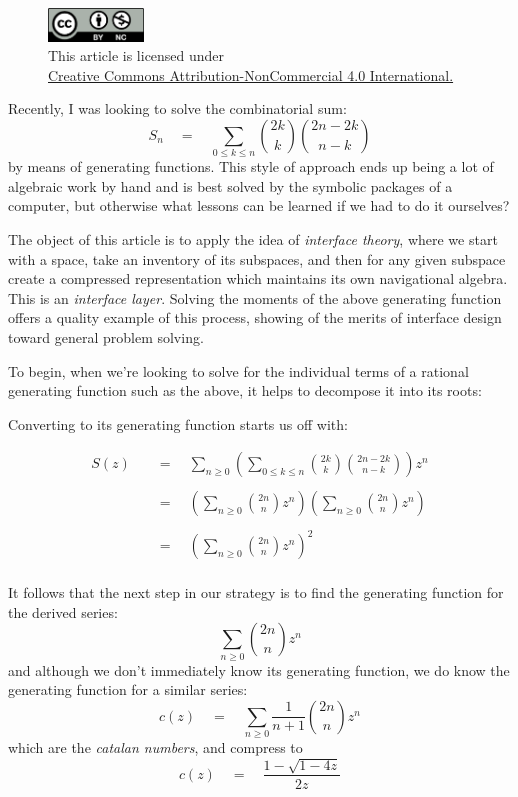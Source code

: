 \documentclass[twoside]{article}
\newcommand{\equals}{\ensuremath{\quad =\quad}}
\newcommand{\cat}{\ensuremath{c}}
\begin{document}
\begin{figure}[h]
\centering
\includegraphics[width=1in]{cc-by-nc.png}\\[0.1in]
\tiny This article is licensed under \\
\href{http://creativecommons.org/licenses/by-nc/4.0/}
{Creative Commons Attribution-NonCommercial 4.0 International.}\\[0.3in]
\end{figure}

Recently, I was looking to solve the combinatorial sum:
$$ S_n \equals \sum_{0\le k\le n}{2k \choose k}{2n-2k \choose n-k} $$
by means of generating functions. This style of approach ends up being a lot of algebraic work by hand and is best solved by
the symbolic packages of a computer, but otherwise what lessons can be learned if we had to do it ourselves?

The object of this article is to apply the idea of \emph{interface theory}, where we start with a space, take an inventory
of its subspaces, and then for any given subspace create a compressed representation which maintains its own navigational algebra.
This is an \emph{interface layer}. Solving the moments of the above generating function offers a quality example of this process,
showing of the merits of interface design toward general problem solving.

To begin, when we're looking to solve for the individual terms of a rational generating function such as the above, it helps to decompose
it into its roots:

Converting to its generating function starts us off with:

\begin{align*}
S(z)		& \equals \sum_{n\ge 0}\left(\sum_{0\le k\le n}{2k \choose k}{2n-2k \choose n-k}\right)z^n		\\
															\\
		& \equals \left(\sum_{n\ge 0}{2n \choose n}z^n\right)\left(\sum_{n\ge 0}{2n \choose n}z^n\right)	\\
															\\
		& \equals \left(\sum_{n\ge 0}{2n \choose n}z^n\right)^2							\\
\end{align*}

It follows that the next step in our strategy is to find the generating function for the derived series:
$$ \sum_{n\ge 0}{2n \choose n}z^n $$
and although we don't immediately know its generating function, we do know the generating function for a similar series:
$$ \cat(z) \equals \sum_{n\ge 0}\frac{1}{n+1}{2n \choose n}z^n $$
which are the \emph{catalan numbers}, and compress to
$$ \cat(z) \equals \frac{1-\sqrt{1-4z}}{2z} $$
\end{document}
